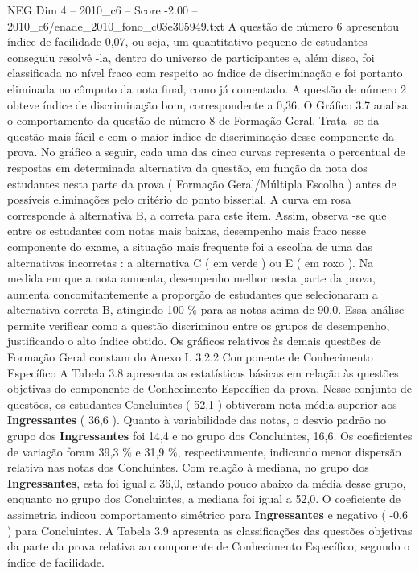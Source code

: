 \begin{textsample}{NEG Dim 4 – 2010\_c6 – Score -2.00 – 2010\_c6/enade\_2010\_fono\_c03e305949.txt}
A questão de número 6 apresentou índice de facilidade 0,07, ou seja, um quantitativo pequeno de estudantes conseguiu resolvê -la, dentro do universo de participantes e, além disso, foi classificada no nível fraco com respeito ao índice de discriminação e foi portanto eliminada no cômputo da nota final, como já comentado.
A questão de número 2 obteve índice de discriminação bom, correspondente a 0,36.
O Gráfico 3.7 analisa o comportamento da questão de número 8 de Formação Geral.
Trata -se da questão mais fácil e com o maior índice de discriminação desse componente da prova.
No gráfico a seguir, cada uma das cinco curvas representa o percentual de respostas em determinada alternativa da questão, em função da nota dos estudantes nesta parte da prova ( Formação Geral/Múltipla Escolha ) antes de possíveis eliminações pelo critério do ponto bisserial.
A curva em rosa corresponde à alternativa B, a correta para este item.
Assim, observa -se que entre os estudantes com notas mais baixas, desempenho mais fraco nesse componente do exame, a situação mais frequente foi a escolha de uma das alternativas incorretas : a alternativa C ( em verde ) ou E ( em roxo ).
Na medida em que a nota aumenta, desempenho melhor nesta parte da prova, aumenta concomitantemente a proporção de estudantes que selecionaram a alternativa correta B, atingindo 100 \% para as notas acima de 90,0.
Essa análise permite verificar como a questão discriminou entre os grupos de desempenho, justificando o alto índice obtido.
Os gráficos relativos às demais questões de Formação Geral constam do Anexo I. 3.2.2 Componente de Conhecimento Específico A Tabela 3.8 apresenta as estatísticas básicas em relação às questões objetivas do componente de Conhecimento Específico da prova.
Nesse conjunto de questões, os estudantes Concluintes ( 52,1 ) obtiveram nota média superior aos \textbf{Ingressantes} ( 36,6 ).
Quanto à variabilidade das notas, o desvio padrão no grupo dos \textbf{Ingressantes} foi 14,4 e no grupo dos Concluintes, 16,6.
Os coeficientes de variação foram 39,3 \% e 31,9 \%, respectivamente, indicando menor dispersão relativa nas notas dos Concluintes.
Com relação à mediana, no grupo dos \textbf{Ingressantes}, esta foi igual a 36,0, estando pouco abaixo da média desse grupo, enquanto no grupo dos Concluintes, a mediana foi igual a 52,0.
O coeficiente de assimetria indicou comportamento simétrico para \textbf{Ingressantes} e negativo ( -0,6 ) para Concluintes.
A Tabela 3.9 apresenta as classificações das questões objetivas da parte da prova relativa ao componente de Conhecimento Específico, segundo o índice de facilidade.

\end{textsample}
